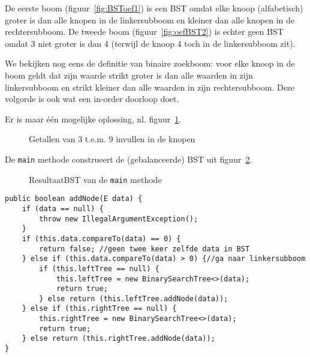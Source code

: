 \begin{Oplossing}{3.1}
De eerste boom (figuur~\ref{fig:BSToef1}) is een BST omdat elke knoop (alfabetisch) groter is dan alle knopen in de linkersubboom en kleiner dan alle knopen in de rechtersubboom. De tweede boom (figuur~\ref{fig:oefBST2}) is echter geen BST omdat 3 niet groter is dan 4 (terwijl de knoop 4 toch in de linkersubboom zit).
\end{Oplossing}
\begin{Oplossing}{3.2}
We bekijken nog eens de definitie van binaire zoekboom: voor elke knoop in de boom geldt dat zijn waarde strikt groter is dan alle waarden in zijn linkersubboom en strikt kleiner dan alle waarden in zijn rechtersubboom. Deze volgorde is ook wat een in-order doorloop doet.
\end{Oplossing}
\begin{Oplossing}{3.3}
Er is maar één mogelijke oplossing, nl. figuur~\ref{fig:oefBST39opl}.
\begin{figure}[htbp]
    \centering
{}
\caption{Getallen van 3 t.e.m. 9 invullen in de knopen}
    \label{fig:oefBST39opl}
\end{figure}
\end{Oplossing}
\begin{Oplossing}{3.4}
De \verb+main+ methode construeert de (gebalanceerde) BST uit figuur~\ref{fig:oefBSTmain}.
\begin{figure}[htbp]
    \centering
{}
\cprotect\caption{ResultaatBST van de \verb+main+ methode}
    \label{fig:oefBSTmain}
\end{figure}
\begin{lstlisting}[caption={addNode(data) methode}, label=bstaddnode]
public boolean addNode(E data) {
	if (data == null) {
		throw new IllegalArgumentException();
	}
	if (this.data.compareTo(data) == 0) {
		return false; //geen twee keer zelfde data in BST
	} else if (this.data.compareTo(data) > 0) {//ga naar linkersubboom
		if (this.leftTree == null) {
			this.leftTree = new BinarySearchTree<>(data);
			return true;
		} else return (this.leftTree.addNode(data));
	} else if (this.rightTree == null) {
		this.rightTree = new BinarySearchTree<>(data);
		return true;
	} else return (this.rightTree.addNode(data));
}
\end{lstlisting}

\end{Oplossing}
